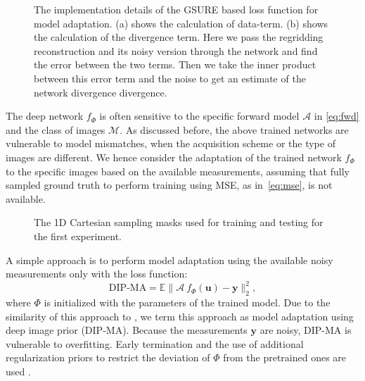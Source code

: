 \documentclass{article}
\newcommand{\bs}{\boldsymbol}
\begin{document}
\begin{figure}	\centering
	
	\caption{\footnotesize{The implementation details of the GSURE based loss function for model adaptation. (a) shows the calculation of data-term. (b) shows the calculation of the divergence term. Here we pass the regridding reconstruction and its noisy version through the network and find the error between the two terms. Then we take the inner product between this error term and the noise to get an estimate of the network divergence divergence.}}
	\label{fig:gsure} \vspace{-2em}
\end{figure}


The deep network $f_{\Phi}$ is often sensitive to the specific forward model $\mathcal A$ in \eqref{eq:fwd} and the class of images $\mathcal M$. As discussed before, the above trained networks are vulnerable to model mismatches, when the acquisition scheme or the type of images are different. We hence consider the adaptation of the trained network $f_{\Phi}$ to the specific images based on the available measurements, assuming that fully sampled ground truth to perform training using MSE, as in~\eqref{eq:mse}, is not available. 

\begin{figure}[b!]	\centering
	 	\qquad
	\caption{\footnotesize{The 1D Cartesian sampling masks used for training and testing for the first experiment.}}
	\label{fig:masks1d}
\end{figure}

A simple approach is to perform model adaptation using the available noisy measurements only with the loss function:
\begin{equation}
	\label{eq:dip}
	\text{DIP-MA}= \mathbb E \| \mathcal A~f_{\Phi}(\bs u) -  \bs y \|_2^2,
\end{equation}
where $\Phi$ is initialized with the parameters of the trained model. Due to the similarity of this approach to \cite{dip2018}, we term this approach as model adaptation using deep image prior (DIP-MA). Because the measurements $\bs y$ are noisy, DIP-MA is vulnerable to overfitting. Early termination and the use of additional regularization priors to restrict the deviation of $\Phi$ from the pretrained ones are used \cite{sigmanet}. 
\end{document}

